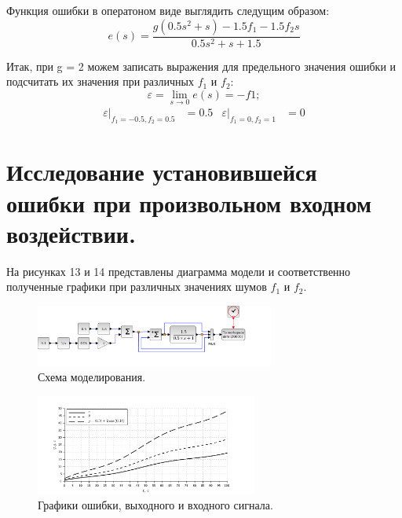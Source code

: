 \documentclass[a3paper, 11pt]{article}
\begin{document}
Функция ошибки в оператоном виде выглядить следущим образом:
\begin{equation}
    e(s) = \frac{g(0.5s^2 + s) - 1.5f_1 - 1.5f_2s}{0.5s^2 + s + 1.5}
\end{equation}
\par
Итак, при g = 2 можем записать выражения для предельного значения ошибки и подсчитать их значения при различных $f_1$ и $f_2$:
\begin{equation}
    \varepsilon = \lim_{s\rightarrow 0}{e(s)} = -f1;
\end{equation}
\begin{align*}
    \varepsilon|_{f_1 = -0.5, f_2 = 0.5} & = 0.5 & \varepsilon|_{f_1 = 0, f_2 = 1} & = 0
\end{align*}

\section*{Исследование установившейся ошибки при произвольном входном воздействии.}
На рисунках 13 и 14 представлены диаграмма модели и соответственно полученные графики при различных значениях шумов $f_1$ и $f_2$.

\begin{figure}[h!]
    \centering
    \includegraphics[width = 0.7\textwidth]{images/model4.pdf}
    \caption{Схема моделирования.}
\end{figure}
\begin{figure}[h!]
    \centering
    \includegraphics[width = 0.65\textwidth]{images/graph4.pdf}
    \caption{Графики ошибки, выходного и входного сигнала.} 
\end{figure}
\end{document}
